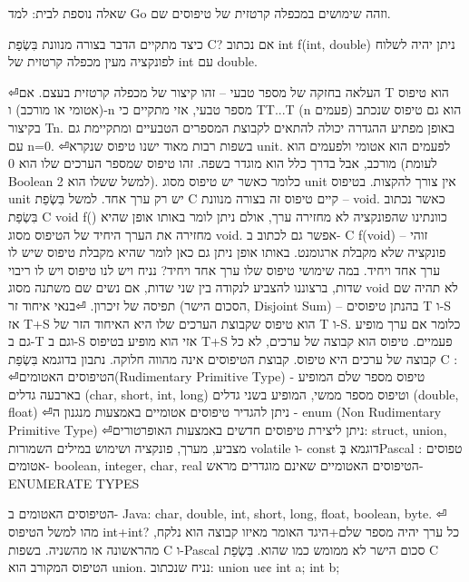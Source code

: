 \begin{טבלא}[!htbp]
      שאלה נוספת לבית: למד Go וזהה שימושים במכפלה קרטזית של טיפוסים שם.

      כיצד מתקיים הדבר בצורה מנוונת בִּשְׂפַת C?
      אם נכתוב int f(int, double) ניתן יהיה לשלוח לפונקציה מעין מכפלה קרטזית של int עם double.

⏎העלאה בחזקה של מספר טבעי – זהו קיצור של מכפלה קרטזית בעצם. אם T הוא טיפוס (אטומי או מורכב) ו-n מספר טבעי, אזי מתקיים כי TT...T (n פעמים) הוא גם טיפוס שנכתב בקיצור Tn.
      באופן מפתיע ההגדרה יכולה להתאים לקבוצת המספרים הטבעיים ומתקיימת גם עם n=0.
⏎בשפות רבות מאוד ישנו טיפוס שנקרא unit. לפעמים הוא אטומי ולפעמים הוא מורכב, אבל בדרך כלל הוא מוגדר בשפה. זהו טיפוס שמספר הערכים שלו הוא 0 (לעומת Boolean למשל ששלו הוא 2). כלומר כאשר יש טיפוס מסוג unit אין צורך להקצות.
      בטיפוס unit יש רק ערך אחד. למשל בִּשְׂפַת C קיים טיפוס זה בצורה מנוונת – void. כאשר נכתוב בִּשְׂפַת C void f(){} כוונתינו שהפונקציה לא מחזירה ערך, אולם ניתן לומר באותו אופן שהיא מחזירה את הערך היחיד של הטיפוס מסוג void. אפשר גם לכתוב ב- C f(void) – זוהי פונקציה שלא מקבלת ארגומנט. באותו אופן ניתן גם כאן לומר שהיא מקבלת טיפוס שיש לו ערך אחד ויחיד.
      במה שימושי טיפוס שלו ערך אחד ויחיד?
      נניח ויש לנו טיפוס ויש לו ריבוי שדות, ברצוננו להצביע לנקודה בין שני שדות, אם נשים שם משתנה מסוג void לא תהיה שם תפיסה של זיכרון.
⏎בנאי איחוד זר (הסכום הישר, Disjoint Sum) – בהנתן טיפוסים T ו-S אז T+S הוא טיפוס שקבוצת הערכים שלו היא האיחוד הזר של T ו-S. כלומר אם ערך מופיע גם ב-T וגם ב-S אזי הוא מופיע בטיפוס T+S פעמיים. טיפוס הוא קבוצה של ערכים, לא כל קבוצה של ערכים היא טיפוס.
      קבוצת הטיפוסים אינה מהווה חלוקה.
      נתבון בדוגמא בִּשְׂפַת C :
⏎הטיפוסים האטומים(Rudimentary Primitive Type) - טיפוס מספר שלם המופיע בארבעה גדלים (char, short, int, long) וטיפוס מספר ממשי, המופיע בשני גדלים
      (double, float)
⏎ניתן להגדיר טיפוסים אטומיים באמצעות מנגנון ה - enum
      (Non Rudimentary Primitive Type)
⏎ניתן ליצירת טיפוסים חדשים באמצעות האופרטורים: struct, union, מצביע, מערך, פונקציה ושימוש במילים השמורות volatile ו- const
      דוגמא בְּPascal :
      טפוסים אטומים- boolean, integer, char, real
      הטיפוסים האטומיים שאינם מוגדרים מראש- ENUMERATE TYPES

      הטיפוסים האטומים ב- Java:
      char, double, int, short, long, float, boolean, byte.
⏎
      מהו למשל הטיפוס int+int? כל ערך יהיה מספר שלם+היגד האומר מאיזו קבוצה הוא נלקח, מהראשונה או מהשניה. בשפות C ו-Pascal סכום הישר לא ממומש כמו שהוא. בִּשְׂפַת C הטיפוס המקורב הוא union. נניח שנכתוב:
      union u{¢¢
        int a;
        int b;
      }


\end{טבלא}
